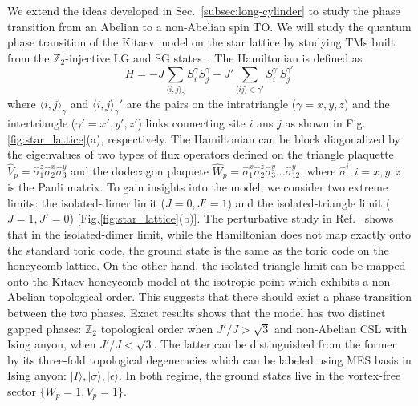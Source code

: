 \documentclass{ntuthesis}
\begin{document}
We extend the ideas developed in Sec.~\ref{subsec:long-cylinder} to study the phase transition from an Abelian to a non-Abelian  spin TO.
%
We will study the quantum phase transition of the Kitaev model on the star lattice by studying TMs built from  the $\mathbb{Z}_2$-injective  LG and SG states~\cite{spin_one_half,2020-spin-one-kitaev,lee2020anisotropy}.
%
The Hamiltonian is defined as~\cite{Hong_Ya_2007}
\begin{equation}
H = -J\sum_{{\langle i,j \rangle}_\gamma} S^\gamma_iS^\gamma_j - J'\sum_{\langle ij\rangle \in \gamma'}S^{\gamma'}_i S^{\gamma'}_j
\label{eq:starKitaev}
\end{equation}
where ${\langle i,j \rangle}_\gamma$  and ${\langle i,j \rangle}_\gamma'$  are 
the pairs on  the intratriangle  ($\gamma = x,y,z$) and  the intertriangle  ($\gamma'=x',y',z'$) links connecting site $i $ ans $j$ as shown in Fig.\ref{fig:star_lattice}(a), respectively.  
%
The Hamiltonian can be block diagonalized by the eigenvalues of two types of flux operators defined on the triangle plaquette $\hat{V}_p = \hat{\sigma}_1^z\hat{\sigma}_2^x\hat{\sigma}^y_3$ and the dodecagon plaquete $\hat{W}_p = \hat{\sigma}_1^x\hat{\sigma}_2^z\hat{\sigma}^y_3...\hat{\sigma}_{12}^y$, where $\hat{\sigma}^i, i = x,y,z$ is the Pauli matrix.
%
To gain insights into the model, we  consider two extreme limits: the isolated-dimer limit ($J =0,J'=1$) and the isolated-triangle limit ($J =1,J'=0$) [Fig.\ref{fig:star_lattice}(b)].
%
The perturbative study in Ref.~\cite{KSL_perturbative} shows that in the isolated-dimer limit, while the Hamiltonian does not map exactly onto the standard toric code, the ground state is the same as the toric code on the honeycomb lattice. 
%
On the other hand, the isolated-triangle limit can be mapped onto the Kitaev honeycomb model at the isotropic point which exhibits a non-Abelian topological order. 
%
This suggests that there should exist a phase transition between the two phases. 
%
Exact results shows that the model has two distinct gapped phases: $\mathbb{Z}_2$ topological order when $J'/J >\sqrt{3}$ and non-Abelian CSL with Ising anyon, when   $J'/J <\sqrt{3}$. The latter can be distinguished from the former by its three-fold topological degeneracies which can be labeled using MES basis in Ising anyon: $|I\rangle, |\sigma\rangle, |\epsilon\rangle$.
%
In both regime, the ground states live in the vortex-free sector $\{W_p = 1, V_p = 1\}$.
%
\end{document}
